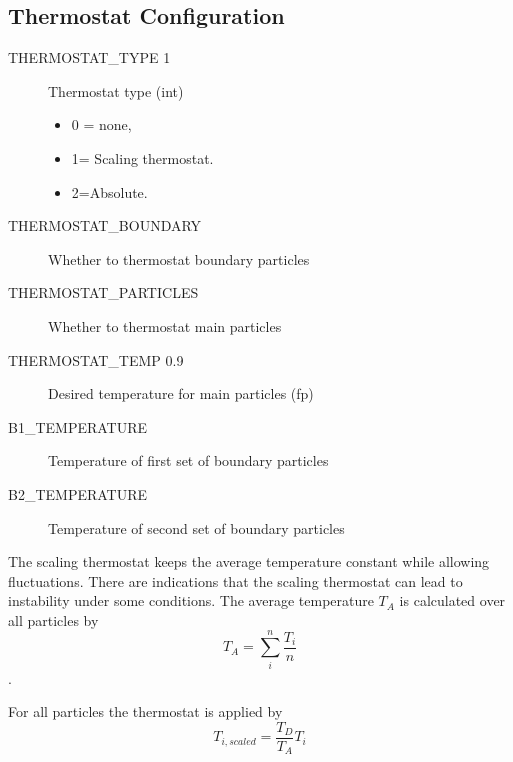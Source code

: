 \subsection{Thermostat Configuration}
\begin{description}
\item[THERMOSTAT\_TYPE 1]       Thermostat type (int)
  \begin{itemize}
  \item 0 = none, 
  \item 1= Scaling thermostat. 
  \item 2=Absolute.
  \end{itemize}
\item[THERMOSTAT\_BOUNDARY]  Whether to thermostat boundary particles
\item[THERMOSTAT\_PARTICLES]  Whether to thermostat main particles
\item[THERMOSTAT\_TEMP 0.9]   Desired temperature for main particles (fp)
\item[B1\_TEMPERATURE] Temperature of first set of boundary particles    
\item[B2\_TEMPERATURE] Temperature of second set of boundary particles    
\end{description}

The scaling thermostat keeps the average temperature constant while allowing
fluctuations. There are indications that the scaling thermostat can lead to
instability under some conditions. The average temperature $T_{A}$ is
calculated over all particles by
%
\[ T_{A} = \sum_{i}^{n} \frac{T_{i}}{n} \].

For all particles the thermostat is applied by
\begin{equation}
 \label{scaling_thermostat}
  T_{i,scaled} = \frac{T_{D}}{T_{A}} T_{i}
\end{equation}

